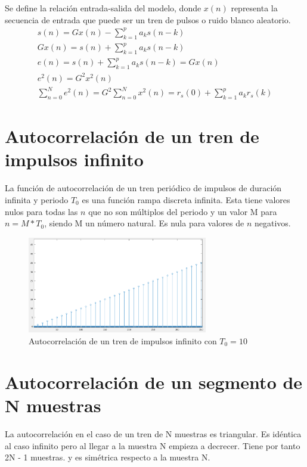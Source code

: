 \documentclass[12pt]{article}
\begin{document}
Se define la relación entrada-salida del modelo, donde $x(n)$ representa la secuencia de entrada que puede ser un tren de pulsos o ruido blanco aleatorio.
\begin{gather*}
	s(n)=Gx(n) - \sum_{k=1}^{p}a_k s(n-k)\\
	Gx(n)=s(n) + \sum_{k=1}^{p}a_k s(n-k)\\
	e(n)= s(n) + \sum_{k=1}^{p}a_k s(n-k) = Gx(n)\\
	e^2(n)= G^2x^2(n)\\
	\sum_{n=0}^{N} e^2(n) =  G^2 \sum_{n=0}^{N}x^2(n) = r_s(0) + \sum_{k=1}^{p} a_k r_s(k)
\end{gather*}





\section{Autocorrelación de un tren de impulsos infinito}
La función de autocorrelación de un tren periódico de impulsos de duración infinita y periodo $T_0$ es una función rampa discreta infinita. Esta tiene valores nulos para todas las $n$ que no son múltiplos del periodo y un valor M para $n = M*T_0$, siendo M un número natural. Es nula para valores de $n$ negativos.

\begin{figure}[H]
	\centering
	\includegraphics[width=0.7\textwidth]{autocorr_tren_infinito.png}
	\caption{Autocorrelación de un tren de impulsos infinito con $T_0 = 10$}
\end{figure}


\section{Autocorrelación de un segmento de N muestras}
La autocorrelación en el caso de un tren de N muestras es triangular. Es idéntica al caso infinito pero al llegar a la muestra N empieza a decrecer. Tiene por tanto 2N - 1 muestras. y es simétrica respecto a la muestra N.
\end{document}
